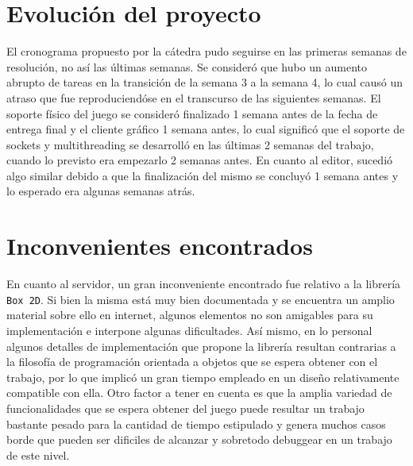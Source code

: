 \documentclass[a4paper]{article}
\begin{document}
\section{Evolución del proyecto}
El cronograma propuesto por la cátedra pudo seguirse en las primeras semanas de resolución, no así las últimas semanas. Se consideró que hubo un aumento abrupto de tareas en la transición de la semana 3 a la semana 4, lo cual causó un atraso que fue reproduciendóse en el transcurso de las siguientes semanas. El soporte físico del juego se consideró finalizado 1 semana antes de la fecha de entrega final y el cliente gráfico 1 semana antes, lo cual significó que el soporte de sockets y multithreading se desarrolló en las últimas 2 semanas del trabajo, cuando lo previsto era empezarlo 2 semanas antes. En cuanto al editor, sucedió algo similar debido a que la finalización del mismo se concluyó 1 semana antes y lo esperado era algunas semanas atrás. 

\section{Inconvenientes encontrados}
En cuanto al servidor, un gran inconveniente encontrado fue relativo a la librería \texttt{Box 2D}. Si bien la misma está muy bien documentada y se encuentra un amplio material sobre ello en internet, algunos elementos no son amigables para su implementación e interpone algunas dificultades. Así mismo, en lo personal algunos detalles de implementación que propone la librería resultan contrarias a la filosofía de programación orientada a objetos que se espera obtener con el trabajo, por lo que implicó un gran tiempo empleado en un diseño relativamente compatible con ella. Otro factor a tener en cuenta es que la amplia variedad de funcionalidades que se espera obtener del juego puede resultar un trabajo bastante pesado para la cantidad de tiempo estipulado y genera muchos casos borde que pueden ser dificiles de alcanzar y sobretodo debuggear en un trabajo de este nivel.
\end{document}
